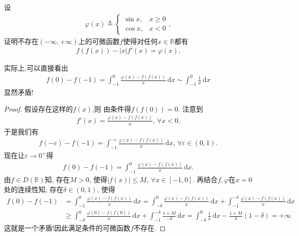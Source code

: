 \documentclass[../../main.tex]{subfiles}%
\begin{document}
\begin{example}
设
\begin{align*}
\varphi(x) \triangleq \begin{cases} 
\sin x, & x \geqslant 0 \\
\cos x, & x < 0 
\end{cases},
\end{align*}
证明不存在$(-\infty,+\infty)$上的可微函数$f$使得对任何$x \in \mathbb{R}$都有
\begin{align*}
f(f(x)) - |x| f'(x) = \varphi(x).
\end{align*}
\end{example}
\begin{note}
实际上,可以直接看出
\begin{align*}
f(0) - f(-1) = \int_{-1}^0 \frac{\varphi(x) - f(f(x))}{x} \, \mathrm{d}x \sim \int_{-1}^0 \frac{1}{x} \, \mathrm{d}x
\end{align*}
显然矛盾!
\end{note}
\begin{proof}

假设存在这样的$f(x)$,则
由条件得$f(f(0))=0$. 注意到
\begin{align*}
f'(x) = \frac{\varphi(x) - f(f(x))}{x}, \, \forall x < 0.
\end{align*}
于是我们有
\begin{align*}
f(-\varepsilon) - f(-1) = \int_{-1}^{-\varepsilon} \frac{\varphi(x) - f(f(x))}{x} \, \mathrm{d}x, \, \forall \varepsilon \in (0,1).
\end{align*}
现在让$\varepsilon \to 0^+$得
\begin{align*}
f(0) - f(-1) = \int_{-1}^0 \frac{\varphi(x) - f(f(x))}{x} \, \mathrm{d}x.
\end{align*}
由$f \in D(\mathbb{R})$知, 存在$M > 0$, 使得$|f(x)| \leqslant M,\ \forall x \in [-1,0]$. 再结合$f,\varphi$在$x=0$处的连续性知, 存在$\delta \in (0,1)$, 使得
\begin{align*}
f(0)-f(-1) &= \int_{-1}^0 \frac{\varphi(x) - f(f(x))}{x} \, \mathrm{d}x = \int_{-\delta}^0 \frac{\varphi(x) - f(f(x))}{x} \, \mathrm{d}x + \int_{-1}^{-\delta} \frac{\varphi(x) - f(f(x))}{x} \, \mathrm{d}x \\
&\geqslant \int_{-\delta}^0 \frac{\varphi(0) - f(f(0))}{x} \, \mathrm{d}x + \int_{-1}^{-\delta} \frac{1 + M}{-\delta} \, \mathrm{d}x = \int_{-\delta}^0 \frac{1}{x} \, \mathrm{d}x - \frac{1 + M}{\delta}(1 - \delta) = +\infty
\end{align*}
这就是一个矛盾!因此满足条件的可微函数$f$不存在.

\end{proof}
\end{document}
